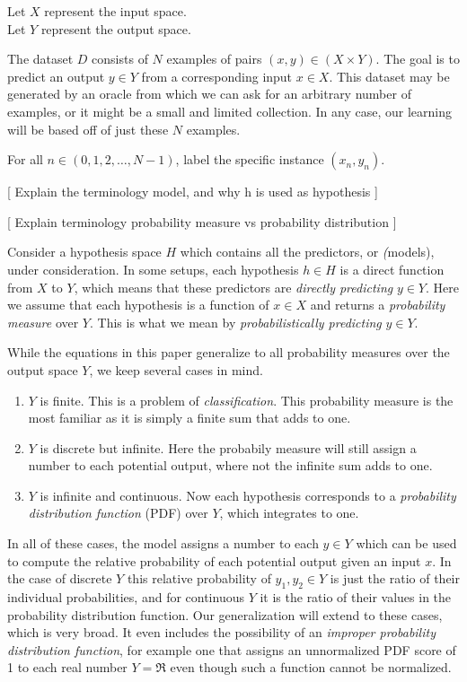 \documentclass[twoside]{article}
\begin{document}
Let \(X\) represent the input space. \\
Let \(Y\) represent the output space.

The dataset \(D\) consists of \(N\) examples of pairs \((x, y) \in (X \times Y) \). The goal is to predict an output \(y \in Y\) from a corresponding input \(x \in X\). This dataset may be generated by an oracle from which we can ask for an arbitrary number of examples, or it might be a small and limited collection. In any case, our learning will be based off of just these \(N\) examples.

For all \(n \in (0, 1, 2,\ldots,N-1)\), label the specific instance \((x_n, y_n)\).

[ Explain the terminology model, and why h is used as hypothesis ]

[ Explain terminology probability measure vs probability distribution ]

Consider a hypothesis space \(H\) which contains all the predictors, or \textit(models), under consideration. In some setups, each hypothesis \(h \in H\) is a direct function from \(X\) to \(Y\), which means that these predictors are \textit{directly predicting} \(y \in Y\). Here we assume that each hypothesis is a function of \(x \in X\) and returns a \textit{probability measure} over \(Y\). This is what we mean by \textit{probabilistically predicting} \(y \in Y\).

While the equations in this paper generalize to all probability measures over the output space \(Y\), we keep several cases in mind.
\begin{enumerate}
	\item \(Y\) is finite. This is a problem of \textit{classification}. This probability measure is the most familiar as it is simply a finite sum that adds to one.
	\item \(Y\) is discrete but infinite. Here the probabily measure will still assign a number to each potential output, where not the infinite sum adds to one.
	\item \(Y\) is infinite and continuous. Now each hypothesis corresponds to a \textit{probability distribution function} (PDF) over \(Y\), which integrates to one.
\end{enumerate}

In all of these cases, the model assigns a number to each \(y \in Y\) which can be used to compute the relative probability of each potential output given an input \(x\). In the case of discrete \(Y\) this relative probability of \(y_1, y_2 \in Y\) is just the ratio of their individual probabilities, and for continuous \(Y\) it is the ratio of their values in the probability distribution function. Our generalization will extend to these cases, which is very broad. It even includes the possibility of an \textit{improper probability distribution function}, for example one that assigns an unnormalized PDF score of 1 to each real number \(Y=\Re\) even though such a function cannot be normalized.
\end{document}

